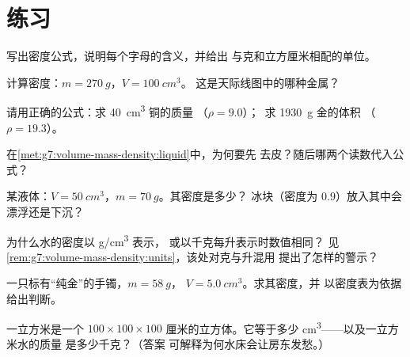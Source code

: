 \section{练习}

\begin{exercise}[$\star$]\label{exo:g7:volume-mass-density:1}
写出密度公式，说明每个字母的含义，并给出
与克和立方厘米相配的单位。
\end{exercise}

\begin{exercise}[$\star$]\label{exo:g7:volume-mass-density:2}
计算密度：$m = \qty{270}{g}$，$V = \qty{100}{cm^3}$。
这是天际线图中的哪种金属？
\end{exercise}

\begin{exercise}[$\star$]\label{exo:g7:volume-mass-density:3}
请用正确的公式：求 \qty{40}{cm^3} 铜的质量
（$\rho = 9.0$）；\ 求 \qty{1930}{g} 金的体积
（$\rho = 19.3$）。
\end{exercise}

\begin{exercise}[$\star$]\label{exo:g7:volume-mass-density:4}
在\cref{met:g7:volume-mass-density:liquid}中，为何要先
去皮？随后哪两个读数代入公式？
\end{exercise}

\begin{exercise}[$\star$]\label{exo:g7:volume-mass-density:5}
某液体：$V = \qty{50}{cm^3}$，$m = \qty{70}{g}$。其密度是多少？
冰块（密度为 $0.9$）放入其中会漂浮还是下沉？
\end{exercise}

\begin{exercise}[$\star$]\label{exo:g7:volume-mass-density:6}
为什么水的密度以 \unit{g/cm^3} 表示，
或以千克每升表示时数值相同？
见\cref{rem:g7:volume-mass-density:units}，该处对克与升混用
提出了怎样的警示？
\end{exercise}

\begin{exercise}[$\star$]\label{exo:g7:volume-mass-density:7}
一只标有“纯金”的手镯，$m = \qty{58}{g}$，
$V = \qty{5.0}{cm^3}$。求其密度，并
以密度表为依据给出判断。
\end{exercise}

\begin{exercise}[$\star\star$]\label{exo:g7:volume-mass-density:8}
一立方米是一个 $100 \times 100 \times 100$
厘米的立方体。它等于多少 \unit{cm^3}——以及一立方米水的质量
是多少千克？（答案
可解释为何水床会让房东发愁。）
\end{exercise}

